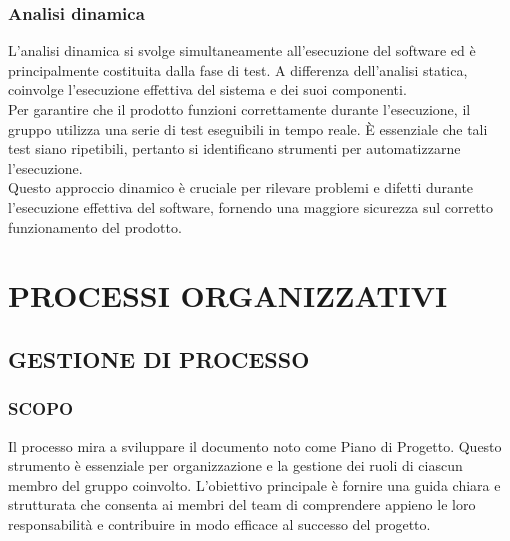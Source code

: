 \documentclass{article}
\begin{document}
    \subsubsection{Analisi dinamica}
    L'analisi dinamica si svolge simultaneamente all'esecuzione del software ed è principalmente costituita dalla fase di test. A differenza dell'analisi statica, coinvolge l'esecuzione effettiva del sistema e dei suoi componenti.\\
    Per garantire che il prodotto funzioni correttamente durante l'esecuzione, il gruppo utilizza una serie di test eseguibili in tempo reale. È essenziale che tali test siano ripetibili, pertanto si identificano strumenti per automatizzarne l'esecuzione.\\
    Questo approccio dinamico è cruciale per rilevare problemi e difetti durante l'esecuzione effettiva del software, fornendo una maggiore sicurezza sul corretto funzionamento del prodotto.
    
\section{PROCESSI ORGANIZZATIVI}
\subsection{GESTIONE DI PROCESSO}

\subsubsection{SCOPO}
Il processo mira a sviluppare il documento noto come Piano di Progetto. Questo strumento è essenziale per organizzazione e la gestione dei ruoli di ciascun membro del gruppo coinvolto. L'obiettivo principale è fornire una guida chiara e strutturata che consenta ai membri del team di comprendere appieno le loro responsabilità e contribuire in modo efficace al successo del progetto.
\end{document}

